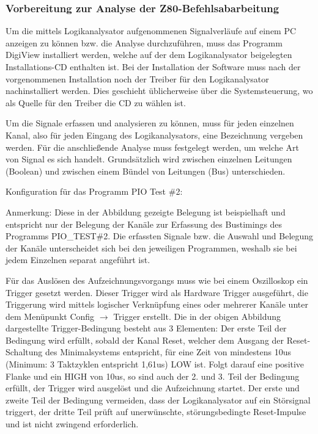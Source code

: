 \subsubsection{Vorbereitung zur Analyse der Z80-Befehlsabarbeitung}
Um die mittels Logikanalysator aufgenommenen Signalverläufe auf einem PC anzeigen zu können bzw. die Analyse durchzuführen, muss das Programm DigiView installiert werden, welche auf der dem Logikanalysator beigelegten Installations-CD enthalten ist. Bei der Installation der Software muss nach der vorgenommenen Installation noch der Treiber für den Logikanalysator nachinstalliert werden. Dies geschieht üblicherweise über die Systemsteuerung, wo als Quelle für den Treiber die CD zu wählen ist.

\label{sec:z80-digiview-kanal}
Um die Signale erfassen und analysieren zu können, muss für jeden einzelnen Kanal, also für jeden Eingang des Logikanalysators, eine Bezeichnung vergeben werden. Für die anschließende Analyse muss festgelegt werden, um welche Art von Signal es sich handelt. Grundsätzlich wird zwischen einzelnen Leitungen (Boolean) und zwischen einem Bündel von Leitungen (Bus) unterschieden.

Konfiguration für das Programm PIO Test \#2:
\begin{warning}
    Anmerkung: Diese in der Abbildung gezeigte Belegung ist beispielhaft und entspricht nur der Belegung der Kanäle zur Erfassung des Bustimings des Programms PIO\_TEST\#2. Die erfassten Signale bzw. die Auswahl und Belegung der Kanäle unterscheidet sich bei den jeweiligen Programmen, weshalb sie bei jedem Einzelnen separat angeführt ist.
\end{warning}

Für das Auslösen des Aufzeichnungsvorgangs muss wie bei einem Oszilloskop ein Trigger gesetzt werden. Dieser Trigger wird als Hardware Trigger ausgeführt, die Triggerung wird mittels logischer Verknüpfung eines oder mehrerer Kanäle unter dem Menüpunkt Config $\rightarrow$ Trigger erstellt.
Die in der obigen Abbildung dargestellte Trigger-Bedingung besteht aus 3 Elementen: Der erste Teil der Bedingung wird erfüllt, sobald der Kanal Reset, welcher dem Ausgang der Reset-Schaltung des Minimalsystems entspricht, für eine Zeit von mindestens 10us (Minimum: 3 Taktzyklen entspricht 1,61us) LOW ist. Folgt darauf eine positive Flanke und ein HIGH von 10us, so sind auch der 2. und 3. Teil der Bedingung erfüllt, der Trigger wird ausgelöst und die Aufzeichnung startet. Der erste und zweite Teil der Bedingung vermeiden, dass der Logikanalysator auf ein Störsignal triggert, der dritte Teil prüft auf unerwünschte, störungsbedingte Reset-Impulse und ist nicht zwingend erforderlich.

